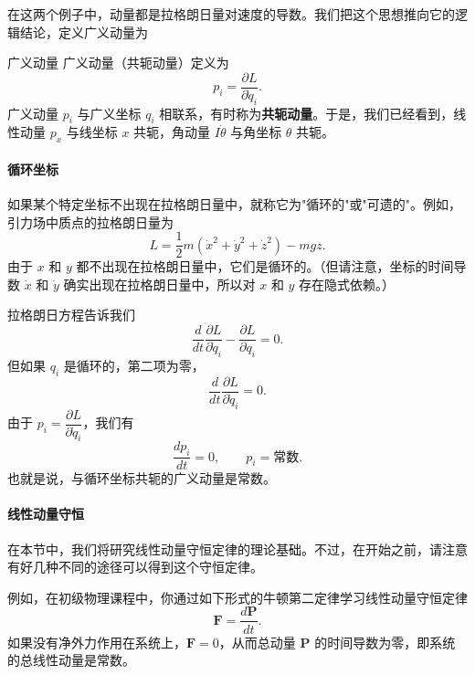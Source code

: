 在这两个例子中，动量都是拉格朗日量对速度的导数。我们把这个思想推向它的逻辑结论，定义广义动量为
\begin{mydefinition}{广义动量}
广义动量（共轭动量）定义为
\begin{equation}\label{eq:1.p}
p_i = \frac{\partial L}{\partial \dot{q}_i}.
\end{equation}
广义动量 $p_i$ 与广义坐标 $q_i$ 相联系，有时称为\textbf{共轭动量}。于是，我们已经看到，线性动量 $p_x$ 与线坐标 $x$ 共轭，角动量 $I\dot{\theta}$ 与角坐标 $\theta$ 共轭。
\end{mydefinition}

\paragraph{循环坐标}
如果某个特定坐标不出现在拉格朗日量中，就称它为"循环的"或"可遗的"。例如，引力场中质点的拉格朗日量为
\begin{equation}\label{eq:1.Lgrav}
L = \frac{1}{2}m(\dot{x}^2 + \dot{y}^2 + \dot{z}^2) - mgz.
\end{equation}
由于 $x$ 和 $y$ 都不出现在拉格朗日量中，它们是循环的。（但请注意，坐标的时间导数 $\dot{x}$ 和 $\dot{y}$ 确实出现在拉格朗日量中，所以对 $x$ 和 $y$ 存在隐式依赖。）

拉格朗日方程告诉我们
\begin{equation*}
\frac{d}{dt}\frac{\partial L}{\partial \dot{q}_i} - \frac{\partial L}{\partial q_i} = 0.
\end{equation*}
但如果 $q_i$ 是循环的，第二项为零，
\begin{equation*}
\frac{d}{dt}\frac{\partial L}{\partial \dot{q}_i} = 0.
\end{equation*}
由于 $p_i = \dfrac{\partial L}{\partial \dot{q}_i}$，我们有
\begin{equation}\label{eq:1.cyc}
\frac{dp_i}{dt} = 0, \qquad p_i = \text{常数}.
\end{equation}
也就是说，与循环坐标共轭的广义动量是常数。

\paragraph{线性动量守恒}
在本节中，我们将研究线性动量守恒定律的理论基础。不过，在开始之前，请注意有好几种不同的途径可以得到这个守恒定律。

例如，在初级物理课程中，你通过如下形式的牛顿第二定律学习线性动量守恒定律
\begin{equation}\label{eq:1.momN}
\mathbf{F} = \frac{d\mathbf{P}}{dt}.
\end{equation}
如果没有净外力作用在系统上，$\mathbf{F} = 0$，从而总动量 $\mathbf{P}$ 的时间导数为零，即系统的总线性动量是常数。

